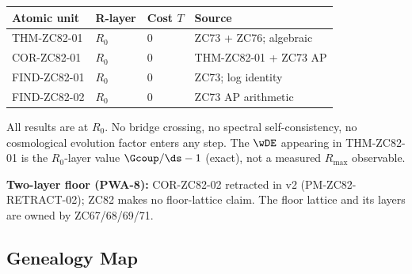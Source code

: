 \documentclass[12pt, a4paper]{article}
\begin{document}
\begin{layerbox}[title={R-Layer Assignments for ZC82}]

{\small\renewcommand{\arraystretch}{1.25}
\begin{center}
\begin{tabular}{@{}llll@{}}
\toprule
Atomic unit & R-layer & Cost $T$ & Source \\
\midrule
THM-ZC82-01 & $R_0$ & $0$ & ZC73 + ZC76; algebraic \\
COR-ZC82-01 & $R_0$ & $0$ & THM-ZC82-01 + ZC73 AP \\
FIND-ZC82-01& $R_0$ & $0$ & ZC73; log identity \\
FIND-ZC82-02& $R_0$ & $0$ & ZC73 AP arithmetic \\
\bottomrule
\end{tabular}
\end{center}}

All results are at $R_0$. No bridge crossing, no spectral
self-consistency, no cosmological evolution factor enters any
step. The $\wDE$ appearing in THM-ZC82-01 is the $R_0$-layer
value $\Gcoup/\ds - 1$ (exact), not a measured $R_{\max}$
observable.

\textbf{Two-layer floor (PWA-8):}
COR-ZC82-02 retracted in v2 (PM-ZC82-RETRACT-02); ZC82 makes no
floor-lattice claim. The floor lattice and its layers are owned
by ZC67/68/69/71.
\end{layerbox}

\subsection{Genealogy Map}
\label{sec:genealogy}
\end{document}
